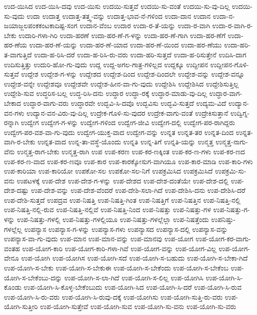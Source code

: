 {ಉದ-ಯಿಸಿದ
ಉದ-ಯಿಸಿ-ದವು
ಉದ-ಯಿಸು
ಉದಯಿ-ಸುತ್ತವೆ
ಉದಯಿ-ಸು-ವಂತೆ
ಉದಯಿ-ಸು-ವು-ದಿಲ್ಲ
ಉದಯಿ-ಸು-ವುದು
ಉದಾ
ಉದಾತ್ತ
ಉದಾತ್ತ-ತತ್ತ್ವ-ವನ್ನು
ಉದಾತ್ತ-ಭಾವ-ನೆ-ಗಳಿಂದ
ಉದಾ-ದಾನ
ಉದಾನ
ಉದಾ-ನ-ಜಯಾಜ್ಜಲಪಂಕಕಂಟಕಾದಿಷ್ಟ-ಸಂಗ
ಉದಾನ-ವೆಂಬ
ಉದಾರ
ಉದಾ-ರ-ತೆ-ಯನ್ನು
ಉದಾ-ರ-ವಾಗಿ
ಉದಾ-ರ-ವಾಗಿ-ರ-ಬೇಕು
ಉದಾರಿ-ಗಳಾ-ಗಿರಿ
ಉದಾ-ಹರಣೆ
ಉದಾ-ಹರ-ಣೆ-ಗ-ಳನ್ನು
ಉದಾ-ಹರ-ಣೆ-ಗಾಗಿ
ಉದಾ-ಹರ-ಣೆಗೆ
ಉದಾ-ಹರ-ಣೆಯ
ಉದಾ-ಹರ-ಣೆ-ಯನ್ನು
ಉದಾ-ಹರ-ಣೆ-ಯಾದ
ಉದಾ-ಹರ-ಣೆ-ಯಿಂದ
ಉದಾ-ಹರ-ಣೆಯು
ಉದಾ-ಹರಿ-ತ-ವಾಗುತ್ತಿದೆ
ಉದಾ-ಹ-ರಿಸಿ-ದರೆ
ಉದಾ-ಹ-ರಿಸಿ-ರು-ವರು
ಉದಾ-ಹರಿ-ಸುತ್ತದೆ
ಉದಾ-ಹ-ರಿಸುತ್ತೇನೆ
ಉದಿಸಿ-ದಾಗ
ಉದಿಸುತ್ತಿತ್ತು
ಉದುರಿ-ಹೋ-ಗು-ವುದು
ಉದ್ದ
ಉದ್ದ-ಅಗಲ-ಗಾತ್ರ-ಗಳಿಲ್ಲದ
ಉದ್ದಕ್ಕೂ
ಉದ್ದೀಪನ
ಉದ್ದೀಪನ-ಗೊಳಿ-ಸುತ್ತವೆ
ಉದ್ದೇಶ
ಉದ್ದೇಶ-ಗ-ಳನ್ನು
ಉದ್ದೇಶದ
ಉದ್ದೇಶ-ದಿಂದ
ಉದ್ದೇಶ-ದಿಂದಲೇ
ಉದ್ದೇಶ-ವನ್ನು
ಉದ್ದೇಶ-ವನ್ನೂ
ಉದ್ದೇಶ-ವನ್ನೇ
ಉದ್ದೇಶವೂ
ಉದ್ದೇಶವೇ
ಉದ್ದೇಶ-ಹೀನ-ವಾ-ಗು-ವುದು
ಉದ್ದೇಶಿಸಿ
ಉದ್ದೇಶಿಸಿದ
ಉದ್ದೇಶಿಸುತ್ತಿಲ್ಲ
ಉದ್ದೇಶಿ-ಸುವ
ಉದ್ಧರಿಸ-ಬಲ್ಲ
ಉದ್ಧ-ರಿಸಿ-ದನು
ಉದ್ಧಾರ
ಉದ್ಧಾ-ರಕ್ಕೆ
ಉದ್ಧಾರ-ಮಾಡು-ವು-ದಿಲ್ಲ
ಉದ್ಧಾರ-ವಾಗ-ಬೇಕಾದ
ಉದ್ಧಾರ-ವಾಗು-ವರು
ಉದ್ಧಾರವೇ
ಉದ್ಭವಿ-ಸಿ-ದವೊ
ಉದ್ಭವಿಸು
ಉದ್ಭವಿ-ಸುತ್ತದೆ
ಉದ್ಯಮ-ವಿದೆ
ಉದ್ಯಾನ-ವನ-ಗಳು
ಉದ್ಯಾನ-ವನ-ವಿರು-ವು-ದಿಲ್ಲ
ಉದ್ರೇಕ-ಗೊಳಿ-ಸು-ವುದರ
ಉದ್ರೇಕ-ವಾಗು-ವಂತೆ
ಉದ್ರೇಕಿಸುತ್ತಾನೆ
ಉದ್ವಿಗ್ನ-ರನ್ನಾಗಿ
ಉದ್ವೇಗ
ಉದ್ವೇಗ-ಗ-ಳನ್ನು
ಉದ್ವೇಗ-ಗಳಿಂದ
ಉದ್ವೇಗ-ಜೀವಿ
ಉದ್ವೇಗ-ದಲ್ಲಿ
ಉದ್ವೇಗ-ಪರ-ರಾಗಿದ್ದರು
ಉದ್ವೇಗ-ಪರ-ವಶ-ವಾ-ಗು-ವುದು
ಉದ್ವೇಗ-ಯುಕ್ತ-ವಾದ
ಉದ್ವೇಗ-ವನ್ನು
ಉನ್ನತ
ಉನ್ನತ-ತರ
ಉನ್ನತ-ದಿಂದ
ಉನ್ನತ-ವಾಗಿ-ರ-ಬೇಕು
ಉನ್ನತ-ವಾದ
ಉನ್ನ-ತಾ-ವಸ್ಥೆ-ಯೊಂದು
ಉನ್ನತಿ
ಉನ್ನ-ತಿಗೆ
ಉನ್ನತಿ-ಯನ್ನು
ಉನ್ಮತ್ತ
ಉನ್ಮತ್ತ-ನಾಗು-ವೆನು
ಉನ್ಮತ್ತ-ರಾಗ-ಬೇಕು
ಉನ್ಮತ್ತ-ರಾಗಿ
ಉಪ
ಉಪ-ಕರಣ
ಉಪ-ಕರ-ಣಕ್ಕಿಂತ
ಉಪ-ಕರ-ಣ-ಗಳು
ಉಪ-ಕರ-ಣದ
ಉಪ-ಕರ-ಣ-ವಾದ
ಉಪ-ಕರ-ಣವೂ
ಉಪ-ಕಾರ
ಉಪ-ಕಾರಕ್ಕೋಸುಗ-ವಾಗಿಯೂ
ಉಪ-ಕಾರ-ಮಾಡಿ
ಉಪ-ಕಾರಿ-ಗಳು
ಉಪ-ಕಾರಿಯಾ
ಉಪ-ಕಾರಿಯೋ
ಉಪಕೋ-ಸಲ
ಉಪಕೋ-ಸಲ-ನಿಗೆ
ಉಪಕ್ರಮಿಸಿದ
ಉಪಕ್ರಮಿಸಿದೆ
ಉಪಕ್ರಮಿ-ಸು-ವನು
ಉಪಟಳಕ್ಕೆ
ಉಪ-ದೇಶ
ಉಪ-ದೇಶ-ಗ-ಳನ್ನು
ಉಪ-ದೇಶದ
ಉಪ-ದೇಶ-ದಂತೆಯೇ
ಉಪ-ದೇಶ-ದಲ್ಲಿ
ಉಪ-ದೇಶ-ದಷ್ಟು
ಉಪ-ದೇಶ-ವನ್ನು
ಉಪ-ದೇಶ-ವೆಂದರೆ
ಉಪ-ದೇಶಿ-ಸಲಾ-ಗಿದೆ
ಉಪ-ದೇಶಿಸಿ-ದನು
ಉಪ-ದೇಶಿಸಿ-ದರೆ
ಉಪ-ದೇಶಿ-ಸುತ್ತದೆ
ಉಪದ್ರವ
ಉಪ-ನಿಷತ್ತಿ
ಉಪ-ನಿಷತ್ತಿ-ಗಿಂತ
ಉಪ-ನಿಷತ್ತಿಗೆ
ಉಪ-ನಿಷತ್ತಿನ
ಉಪ-ನಿಷತ್ತಿ-ನಲ್ಲಿ
ಉಪ-ನಿಷತ್ತಿ-ನಲ್ಲಿ-ರುವ
ಉಪ-ನಿಷತ್ತಿ-ನಲ್ಲಿವೆ
ಉಪ-ನಿಷತ್ತಿ-ನಿಂದ
ಉಪ-ನಿಷತ್ತು
ಉಪ-ನಿಷತ್ತು-ಗಳ
ಉಪ-ನಿಷತ್ತು-ಗ-ಳನ್ನು
ಉಪ-ನಿಷತ್ತು-ಗಳಲ್ಲಿ
ಉಪ-ನಿಷತ್ತು-ಗಳಲ್ಲಿಯೂ
ಉಪ-ನಿಷತ್ತು-ಗಳಲ್ಲೆಲ್ಲಾ
ಉಪ-ನಿಷತ್ತೆಂದು
ಉಪನಿಷ್ತು-ಗಳಲ್ಲೆಲ್ಲ
ಉಪನ್ಯಾಸ
ಉಪನ್ಯಾಸ-ಗ-ಳನ್ನು
ಉಪನ್ಯಾಸ-ಗಳು
ಉಪನ್ಯಾಸದ
ಉಪನ್ಯಾಸ-ದಲ್ಲಿ
ಉಪನ್ಯಾಸ-ವನ್ನು
ಉಪನ್ಯಾಸ-ವಾ-ಗು-ವುದು
ಉಪ-ಮಾನ
ಉಪ-ಮಾನ-ವನ್ನು
ಉಪ-ಮಾನವು
ಉಪ-ಯೋಗ
ಉಪ-ಯೋಗ-ಕರ-ವಾಗು-ವಂತಹ
ಉಪ-ಯೋಗ-ಕಾರಿ
ಉಪ-ಯೋಗ-ಕಾರಿ-ಗಳಾ-ಗಿವೆ
ಉಪ-ಯೋಗ-ವನ್ನು
ಉಪ-ಯೋಗ-ವಿಲ್ಲ
ಉಪ-ಯೋಗ-ವೇನೂ
ಉಪ-ಯೋಗಿ
ಉಪ-ಯೋಗಿಸ
ಉಪ-ಯೋಗಿ-ಸದೆ
ಉಪ-ಯೋಗಿ-ಸ-ಬಹುದು
ಉಪ-ಯೋಗಿ-ಸ-ಬೇಕಾ-ಗಿದೆ
ಉಪ-ಯೋಗಿ-ಸ-ಬೇಕು
ಉಪ-ಯೋಗಿ-ಸ-ಬೇಕುಈ
ಉಪ-ಯೋಗಿ-ಸ-ಬೇಕೆಂದು
ಉಪ-ಯೋಗಿ-ಸ-ಬೇಕೆಂಬ
ಉಪ-ಯೋಗಿ-ಸ-ಬೇಕೆಂಬು-ದನ್ನು
ಉಪ-ಯೋಗಿ-ಸ-ಲಾ-ಗಿದೆ
ಉಪ-ಯೋಗಿ-ಸ-ಲಿಲ್ಲ
ಉಪ-ಯೋಗಿಸಿ
ಉಪ-ಯೋಗಿ-ಸಿ-ಕೊಂಡು
ಉಪ-ಯೋಗಿ-ಸಿ-ಕೊಳ್ಳ-ಬೇಕೆಂಬುದು
ಉಪ-ಯೋಗಿ-ಸಿದ
ಉಪ-ಯೋಗಿ-ಸಿ-ದರೆ
ಉಪ-ಯೋಗಿ-ಸಿ-ರುವ
ಉಪ-ಯೋಗಿ-ಸಿ-ರು-ವರು
ಉಪ-ಯೋಗಿ-ಸಿ-ರುವು-ದಕ್ಕೆ
ಉಪ-ಯೋಗಿಸು
ಉಪ-ಯೋಗಿ-ಸುತ್ತಿ-ರು-ವರು
ಉಪ-ಯೋಗಿ-ಸುತ್ತೀರಿ
ಉಪ-ಯೋಗಿ-ಸುತ್ತೇವೆ
ಉಪ-ಯೋಗಿ-ಸುವ
ಉಪ-ಯೋಗಿ-ಸು-ವನು
ಉಪ-ಯೋಗಿ-ಸು-ವರು
}
